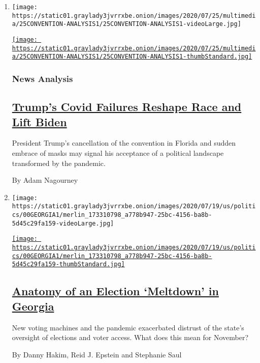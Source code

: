 \begin{enumerate}
\def\labelenumi{\arabic{enumi}.}
\item
  \texttt{[image: https://static01.graylady3jvrrxbe.onion/images/2020/07/25/multimedia/25CONVENTION-ANALYSIS1/25CONVENTION-ANALYSIS1-videoLarge.jpg]}

  \href{/2020/07/25/us/politics/trump-florida-convention.html}{\texttt{[image: https://static01.graylady3jvrrxbe.onion/images/2020/07/25/multimedia/25CONVENTION-ANALYSIS1/25CONVENTION-ANALYSIS1-thumbStandard.jpg]}}

  \hypertarget{news-analysis}{%
  \subsubsection{News Analysis}\label{news-analysis}}

  \hypertarget{trumps-covid-failures-reshape-race-and-lift-biden}{%
  \subsection{\texorpdfstring{\href{/2020/07/25/us/politics/trump-florida-convention.html}{Trump's
  Covid Failures Reshape Race and Lift
  Biden}}{Trump's Covid Failures Reshape Race and Lift Biden}}\label{trumps-covid-failures-reshape-race-and-lift-biden}}

  President Trump's cancellation of the convention in Florida and sudden
  embrace of masks may signal his acceptance of a political landscape
  transformed by the pandemic.

  By Adam Nagourney
\item
  \texttt{[image: https://static01.graylady3jvrrxbe.onion/images/2020/07/19/us/politics/00GEORGIA1/merlin\_173310798\_a778b947-25bc-4156-ba8b-5d45c29fa159-videoLarge.jpg]}

  \href{/2020/07/25/us/politics/georgia-election-voting-problems.html}{\texttt{[image: https://static01.graylady3jvrrxbe.onion/images/2020/07/19/us/politics/00GEORGIA1/merlin\_173310798\_a778b947-25bc-4156-ba8b-5d45c29fa159-thumbStandard.jpg]}}

  \hypertarget{anatomy-of-an-election-meltdown-in-georgia}{%
  \subsection{\texorpdfstring{\href{/2020/07/25/us/politics/georgia-election-voting-problems.html}{Anatomy
  of an Election `Meltdown' in
  Georgia}}{Anatomy of an Election `Meltdown' in Georgia}}\label{anatomy-of-an-election-meltdown-in-georgia}}

  New voting machines and the pandemic exacerbated distrust of the
  state's oversight of elections and voter access. What does this mean
  for November?

  By Danny Hakim, Reid J. Epstein and Stephanie Saul
\end{enumerate}

